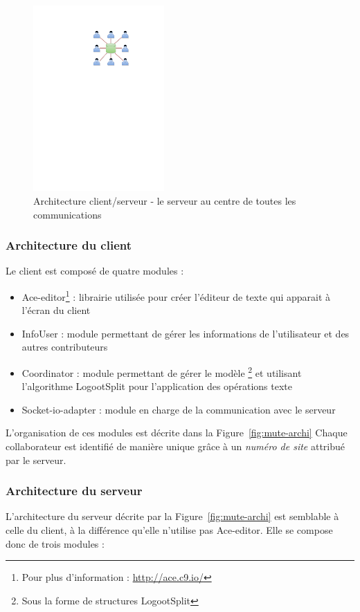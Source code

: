 \documentclass{tnreport}
\begin{document}
\begin{figure}[!h]
  \centering
  \includegraphics[width=5cm]{figures/client-server}
  \caption{Architecture client/serveur - le serveur au centre de toutes les communications}
  \label{fig:cli-serv}
\end{figure}



\subsubsection{Architecture du client}
Le client est composé de quatre modules :

\begin{itemize}
    \item Ace-editor\footnote{Pour plus d'information : \url{http://ace.c9.io/}} : librairie utilisée pour créer l'éditeur de texte qui apparait à l'écran du client
    \item InfoUser : module permettant de gérer les informations de l'utilisateur et des autres contributeurs
    \item Coordinator : module permettant de gérer le modèle \footnote{Sous la forme de structures LogootSplit} et utilisant l'algorithme LogootSplit pour l'application des opérations texte
    \item Socket-io-adapter : module en charge de la communication avec le serveur
\end{itemize}

L'organisation de ces modules est décrite dans la Figure~\ref{fig:mute-archi} 
Chaque collaborateur est identifié de manière unique grâce à un \emph{numéro de site} attribué par le serveur. 

\subsubsection{Architecture du serveur}
L'architecture du serveur décrite par la Figure~\ref{fig:mute-archi} est semblable à celle du client, à la différence qu'elle n'utilise pas Ace-editor.
Elle se compose donc de trois modules :
\end{document}
